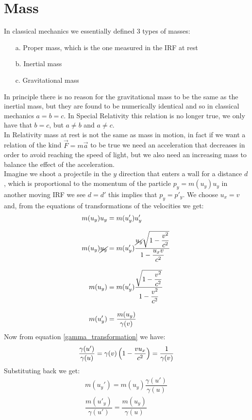 \section{Mass}
In classical mechanics we essentially defined 3 types of masses:
\begin{itemize}
  \item[a.] Proper mass, which is the one measured in the IRF at rest
  \item[b.] Inertial mass
  \item[c.] Gravitational mass
\end{itemize}
In principle there is no reason for the gravitational mass to be the same as the inertial mass, but they are found to be numerically identical and so in classical mechanics $a = b = c$. In Special Relativity this relation is no longer true, we only have that $b = c$, but $a \neq b$ and $a \neq c$.\\
In Relativity mass at rest is not the same as mass in motion, in fact if we want a relation of the kind $\vec{F} = m\vec{a}$ to be true we need an acceleration that decreases in order to avoid reaching the speed of light, but we also need an increasing mass to balance the effect of the acceleration.\\
Imagine we shoot a projectile in the $y$ direction that enters a wall for a distance $d$, which is proportional to the momentum of the particle $p_y = m(u_y)u_y$ in another moving IRF we see $d=d'$ this implies that $p_y = p'_y$. We choose $u_x = v$ and, from the equations of transformations of the velocities we get:
\begin{equation}
  \begin{split}
    m(u_y)u_y &= m(u'_y)u'_y \\[8pt]
    m(u_y)\cancel{u_y} &= m(u'_y)\dfrac{\cancel{u_y}\sqrt{1-\dfrac{v^2}{c^2}}}{1-\dfrac{u_x v}{c^2}} \\[8pt]
    m(u_y) &= m(u'_y)\dfrac{\sqrt{1-\dfrac{v^2}{c^2}}}{1-\dfrac{v^2}{c^2}} \\[8pt]
    m(u'_y) &= \dfrac{m(u_y)}{\gamma(v)}
  \end{split}
\end{equation}
Now from equation \eqref{gamma_transformation} we have:
\begin{equation}
  \dfrac{\gamma(u')}{\gamma(u)} = \gamma(v)\left(1-\dfrac{v u_x}{c^2}\right) = \dfrac{1}{\gamma(v)}
\end{equation}
Substituting back we get:
\begin{equation}
  \begin{split}
    m(u_y') = m(u_y)\dfrac{\gamma(u')}{\gamma(u)} \\[8pt]
    \boxed{\dfrac{m(u'_y)}{\gamma(u')} = \dfrac{m(u_y)}{\gamma(u)}}
  \end{split}
\end{equation}
